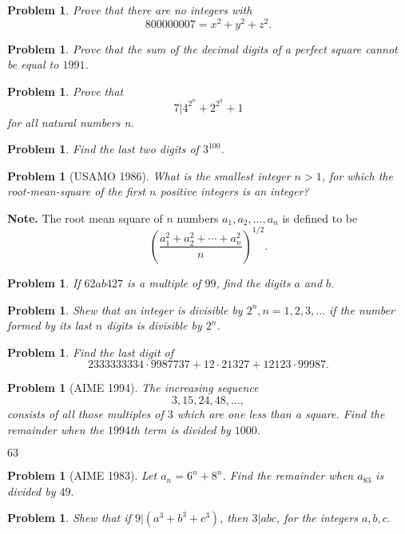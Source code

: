 \documentclass[11pt, openany]{book}
\theoremstyle{change} \theoremheaderfont{\blue\sffamily\bfseries}
\newtheorem{pro}[thm]{Problem}
\theoremstyle{nonumberplain} \theoremheaderfont{\sffamily\bfseries}
\newcommand{\í}{\'{\i}}
\begin{document}
\begin{multicols}{2}
\begin{pro} Prove that there are no integers with $$ 800000007 = x^2 + y^2 + z^2 .$$\end{pro}
\begin{pro} Prove that the sum of the decimal digits of a perfect square cannot be equal
to $1991$. \end{pro}
\begin{pro} Prove that $$7|4^{2^n} + 2^{2^n} + 1$$for all natural numbers
n.\end{pro}
\begin{pro} Find the last two digits of $3^{100}$. \end{pro}
\begin{pro}[USAMO 1986] What is the smallest integer $n > 1$, for
which the root-mean-square of the first $n$ positive integers is
an integer? \end{pro} {\bf Note.} {\footnotesize The root mean
square of $n$ numbers $a_1 , a_2 , \ldots , a_n$ is defined to be
$$ \left(\frac{a_1 ^2 + a_2 ^2 + \cdots + a_n
^2}{n}\right)^{1/2}.$$}


\begin{pro} If $62ab427$ is a  multiple of  $99$, find the digits
$a$ and $b$.\end{pro}
\begin{pro} Shew that an integer is divisible by $2^n, n = 1, 2, 3, \ldots$ if the number formed
by its last $n$ digits is divisible by $2^n$.\end{pro}
\begin{pro} Find the last digit of
$$2333333334\cdot 9987737 + 12\cdot 21327 + 12123\cdot 99987.$$ \end{pro}

\begin{pro}[AIME 1994] The increasing sequence $$3, 15, 24, 48, \ldots ,$$
consists of all those multiples of  $3$ which are one less than a
square. Find the remainder when the $1994$th term is divided by
$1000$.
\begin{answer}$63$  \end{answer}
\end{pro}

\begin{pro}[AIME 1983] Let $a_n = 6^n + 8^n$. Find the remainder when $a_{83}$ is
divided by $49.$ \end{pro}
\begin{pro} Shew that if  $9|(a^3 + b^3 + c^3)$, then $3|abc$, for the integers
$a, b, c.$ \end{pro}
\end{multicols}
\end{document}

